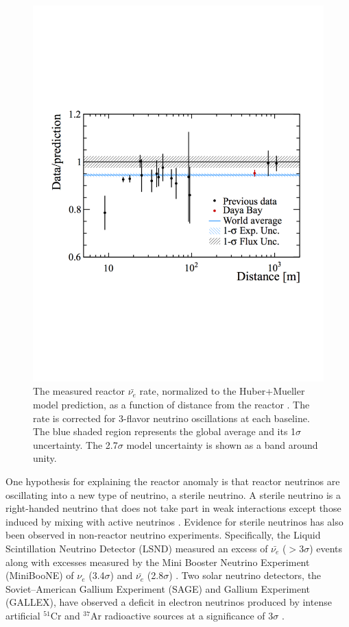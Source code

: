 \begin{figure}[H]
	\centering
	\includegraphics[width=0.6\linewidth]{tex/3-reactorneutrinos-images/WorldAvgFlux}
	\caption[World average of reactor $\bar{\nu_{e}}$ flux. ]{The measured reactor $\bar{\nu_{e}}$ rate, normalized to the Huber+Mueller model prediction, as a function of distance from the reactor \cite{DayaBayFlux2018}. The rate is corrected for 3-flavor neutrino oscillations at each baseline. The blue shaded region represents the global average and its 1$\sigma$ uncertainty. The 2.7$\sigma$ model uncertainty is shown as a band around unity.}
	\label{fig:worldavgflux}
\end{figure}

One hypothesis for explaining the reactor anomaly is that reactor neutrinos are oscillating into a new type of neutrino, a sterile neutrino. 
A sterile neutrino is a right-handed neutrino that does not take part in weak interactions except those induced by mixing with active neutrinos \cite{Abazajian:2012ys}. 
Evidence for sterile neutrinos has also been observed in non-reactor neutrino experiments. 
Specifically, the Liquid Scintillation Neutrino Detector (LSND)  measured an excess of $\bar{\nu_{e}}$ ($>$3$\sigma$) events \cite{Aguilar:2001ty} along with excesses measured by the Mini Booster Neutrino Experiment (MiniBooNE) of $\nu_{e}$ (3.4$\sigma$) and $\bar{\nu_{e}}$ (2.8$\sigma$) \cite{Aguilar-Arevalo:2013pmq}.
Two solar neutrino detectors, the Soviet–American Gallium Experiment (SAGE) and Gallium Experiment (GALLEX), have observed a deficit in electron neutrinos produced by intense artificial $^{51}$Cr and $^{37}$Ar radioactive sources at a significance of 3$\sigma$ \cite{Giunti:2010zu}.


